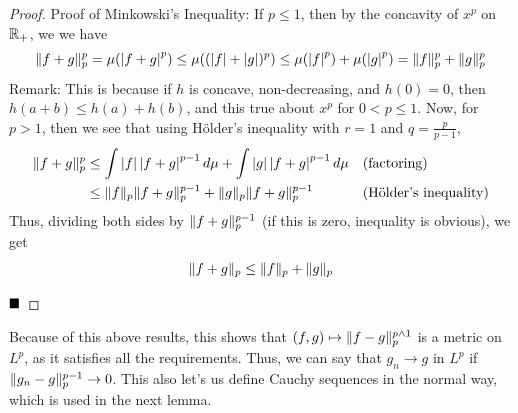
\vspace{0.2cm}

\begin{proof}{Proof of Minkowski's Inequality:}
    If $p \leq 1$, then by the concavity of $x^{p}$ on $\mathbb{R}_{+}$, we we have
    \[ \lVert {f + g} \rVert_{p}^{p} = \mu (\left\lvert {f + g} \right\rvert^{p}) \leq \mu((\left\lvert {f} \right\rvert + \left\lvert {g} \right\rvert)^{p}) \leq \mu(\left\lvert {f} \right\rvert^{p}) + \mu(\left\lvert {g} \right\rvert^{p}) = \lVert {f} \rVert_{p}^{p} + \lVert {g} \rVert_{p}^{p} \]
    Remark: This is because if $h$ is concave, non-decreasing, and $h(0) = 0$, then $h(a + b) \leq h(a) + h(b)$, and this true about $x^{p}$ for $0 < p \leq 1$. Now, for $p > 1$, then we see that using H\"older's inequality with $r = 1$ and $q = \frac{p}{p - 1}$, 
    \begin{align*}
        \lVert {f + g} \rVert_{p}^{p} &\leq \int \left\lvert {f} \right\rvert\left\lvert {f + g} \right\rvert^{p - 1}d\mu + \int \left\lvert {g} \right\rvert\left\lvert {f + g} \right\rvert^{p - 1}d\mu && (\text{factoring})\\
        &\leq \lVert {f} \rVert_{p}\lVert {f + g} \rVert_{p}^{p - 1} + \lVert {g} \rVert_{p}\lVert {f + g} \rVert_{p}^{p - 1} && (\text{H\"older's inequality})\\
    \end{align*}
    Thus, dividing both sides by $\lVert {f + g} \rVert_{p}^{p - 1}$ (if this is zero, inequality is obvious), we get
    \[ \lVert {f + g} \rVert_{p} \leq \lVert {f} \rVert_{p} + \lVert {g} \rVert_{p} \]

    $\qed$
\end{proof}

Because of this above results, this shows that $(f, g) \mapsto \lVert {f - g} \rVert_{p}^{p \wedge 1}$ is a metric on $L^{p}$, as it satisfies all the requirements. Thus, we can say that $g_n \to g$ in $L^{p}$ if $\lVert {g_n - g} \rVert_{p}^{p - 1} \to 0$. This also let's us define Cauchy sequences in the normal way, which is used in the next lemma. 

